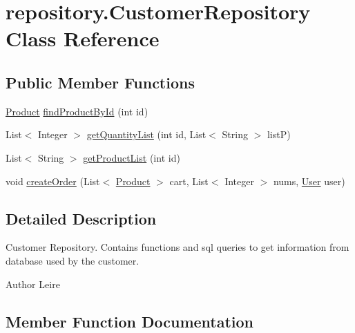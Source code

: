 \hypertarget{classrepository_1_1_customer_repository}{}\section{repository.\+Customer\+Repository Class Reference}
\label{classrepository_1_1_customer_repository}
\subsection*{Public Member Functions}
\begin{DoxyCompactItemize}
\item 
\mbox{\hyperlink{classentity_1_1_product}{Product}} \mbox{\hyperlink{classrepository_1_1_customer_repository_ae640f52235917c0cc786c4a589f66298}{find\+Product\+By\+Id}} (int id)
\item 
List$<$ Integer $>$ \mbox{\hyperlink{classrepository_1_1_customer_repository_aaf10d05eb98d9995edda61c3fe5e04f2}{get\+Quantity\+List}} (int id, List$<$ String $>$ listP)
\item 
List$<$ String $>$ \mbox{\hyperlink{classrepository_1_1_customer_repository_a18f31c471b0a4adfacd1ea23499cb02b}{get\+Product\+List}} (int id)
\item 
void \mbox{\hyperlink{classrepository_1_1_customer_repository_abf327e94b8e4245b19cb5f99963bb28e}{create\+Order}} (List$<$ \mbox{\hyperlink{classentity_1_1_product}{Product}} $>$ cart, List$<$ Integer $>$ nums, \mbox{\hyperlink{classentity_1_1_user}{User}} user)
\end{DoxyCompactItemize}


\subsection{Detailed Description}
Customer Repository. Contains functions and sql queries to get information from database used by the customer.

\begin{DoxyAuthor}{Author}
Leire 
\end{DoxyAuthor}


\subsection{Member Function Documentation}
\mbox{\label{classrepository_1_1_customer_repository_abf327e94b8e4245b19cb5f99963bb28e}} 
